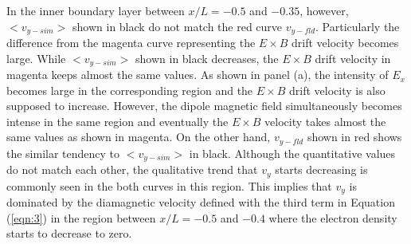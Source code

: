\documentclass[draft,jgrga]{agutex2015}
\begin{document}
\begin{article}
In the inner boundary layer between $x/L=-0.5$ and $-0.35$, 
however, 
$<v_{y-sim}>$ shown in black do not match the red curve
$v_{y-fld}$.
%
%
Particularly the difference from the magenta curve representing 
the $E \times B$ drift velocity becomes large.
While $<v_{y-sim}>$ shown in black decreases,
the $E \times B$ drift velocity in magenta keeps almost the same values. 
As shown in panel (a), the intensity of $E_x$ becomes large 
in the corresponding region and the $E \times B$ drift velocity 
is also supposed to increase. 
However, the dipole magnetic field simultaneously becomes intense 
in the same region and eventually the $E \times B$ velocity 
takes almost the same values as shown in magenta.
On the other hand, 
$v_{y-fld}$ shown in red shows the similar tendency to 
$<v_{y-sim}>$ in black.
Although the quantitative values do not match each other,
the qualitative trend that $v_y$ starts decreasing 
is commonly seen in the both curves in this region.
This implies that 
$v_y$ is dominated by the diamagnetic velocity defined with 
the third term in Equation (\ref{eqn:3})
in the region between $x/L =-0.5$ and $-0.4$ 
where the electron density starts to decrease to zero. 


\end{article}
\end{document}
